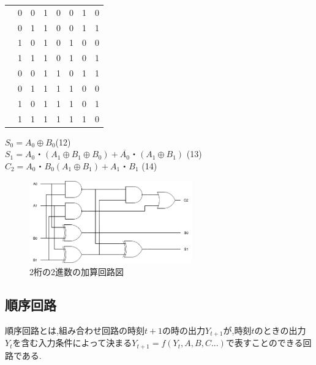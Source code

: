 \documentclass[twocolumn, 10pt,a4j]{jsarticle}
\begin{document}
\begin{enumerate}
\begin{table}[H]
\begin{tabular}{l|llll|lll}
            & 0       & 0       & 1       & 0       & 0       & 1       & 0       \\
            & 0       & 1       & 1       & 0       & 0       & 1       & 1       \\
            & 1       & 0       & 1       & 0       & 1       & 0       & 0       \\
            & 1       & 1       & 1       & 0       & 1       & 0       & 1       \\
            & 0       & 0       & 1       & 1       & 0       & 1       & 1       \\
            & 0       & 1       & 1       & 1       & 1       & 0       & 0       \\
            & 1       & 0       & 1       & 1       & 1       & 0       & 1       \\
            & 1       & 1       & 1       & 1       & 1       & 1       & 0      
        \end{tabular}
      \end{table}
      $S_{0} = A_{0} \oplus B_{0} $\quad(12) \\
      $S_{1} = A_{0}・(A_{1} \oplus B_{1} \oplus B_{0}) + \overline{A_{0}}・(A_{1} \oplus B_{1})$ \quad(13) \\
      $C_{2} = A_{0}・B_{0}(A_{1} \oplus B_{1}) + A_{1}・B_{1}$ \quad(14) \\
      \begin{figure}[H]
        \begin{center}
          \includegraphics[width=7cm]{../img/half_adder/ronri.png}
          \caption{2桁の2進数の加算回路図}
        \end{center}
      \end{figure}

    \end{enumerate}
\subsection{順序回路}
  順序回路とは,組み合わせ回路の時刻$t+1$の時の出力$Y_{t+1}$が,時刻$t$のときの出力
  $Y_{t}$を含む入力条件によって決まる$Y_{t+1} = f(Y_{t},A,B,C...)$で表すことのできる回路である.
\end{document}
